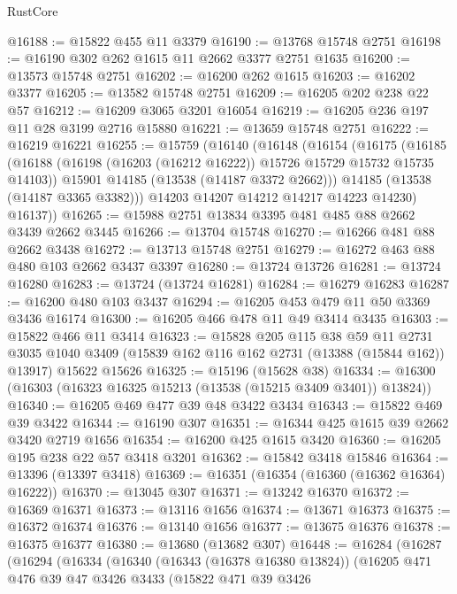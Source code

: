 \begin{lexlean}{RustCore}
\begin{coremodule}
@16188 := @15822 @455 @11 @3379
@16190 := @13768 @15748 @2751
@16198 := @16190 @302 @262 @1615 @11 @2662 @3377 @2751 @1635
@16200 := @13573 @15748 @2751
@16202 := @16200 @262 @1615
@16203 := @16202 @3377
@16205 := @13582 @15748 @2751
@16209 := @16205 @202 @238 @22 @57
@16212 := @16209 @3065 @3201 @16054
@16219 := @16205 @236 @197 @11 @28 @3199 @2716 @15880
@16221 := @13659 @15748 @2751
@16222 := @16219 @16221
@16255 := @15759
    (@16140
      (@16148
        (@16154
          (@16175
            (@16185
              (@16188 (@16198 (@16203 (@16212 @16222)) @15726 @15729 @15732 @15735 @14103))
              @15901
              @14185
              (@13538 (@14187 @3372 @2662)))
            @14185
            (@13538 (@14187 @3365 @3382)))
          @14203
          @14207
          @14212
          @14217
          @14223
          @14230)
        @16137))
@16265 := @15988 @2751 @13834 @3395 @481 @485 @88 @2662 @3439 @2662 @3445
@16266 := @13704 @15748
@16270 := @16266 @481 @88 @2662 @3438
@16272 := @13713 @15748 @2751
@16279 := @16272 @463 @88 @480 @103 @2662 @3437 @3397
@16280 := @13724 @13726
@16281 := @13724 @16280
@16283 := @13724 (@13724 @16281)
@16284 := @16279 @16283
@16287 := @16200 @480 @103 @3437
@16294 := @16205 @453 @479 @11 @50 @3369 @3436 @16174
@16300 := @16205 @466 @478 @11 @49 @3414 @3435
@16303 := @15822 @466 @11 @3414
@16323 := @15828
    @205
    @115
    @38
    @59
    @11
    @2731
    @3035
    @1040
    @3409
    (@15839 @162 @116 @162 @2731 (@13388 (@15844 @162)) @13917)
    @15622
    @15626
@16325 := @15196 (@15628 @38)
@16334 := @16300 (@16303 (@16323 @16325 @15213 (@13538 (@15215 @3409 @3401)) @13824))
@16340 := @16205 @469 @477 @39 @48 @3422 @3434
@16343 := @15822 @469 @39 @3422
@16344 := @16190 @307
@16351 := @16344 @425 @1615 @39 @2662 @3420 @2719 @1656
@16354 := @16200 @425 @1615 @3420
@16360 := @16205 @195 @238 @22 @57 @3418 @3201
@16362 := @15842 @3418 @15846
@16364 := @13396 (@13397 @3418)
@16369 := @16351 (@16354 (@16360 (@16362 @16364) @16222))
@16370 := @13045 @307
@16371 := @13242 @16370
@16372 := @16369 @16371
@16373 := @13116 @1656
@16374 := @13671 @16373
@16375 := @16372 @16374
@16376 := @13140 @1656
@16377 := @13675 @16376
@16378 := @16375 @16377
@16380 := @13680 (@13682 @307)
@16448 := @16284
    (@16287
      (@16294
        (@16334
          (@16340
            (@16343 (@16378 @16380 @13824))
            (@16205
              @471
              @476
              @39
              @47
              @3426
              @3433
              (@15822
                @471
                @39
                @3426

\end{coremodule}
\end{lexlean}
